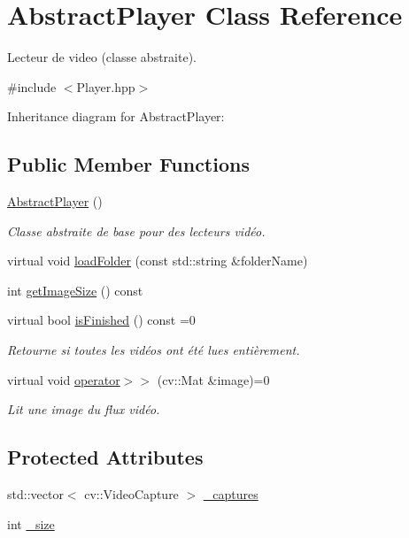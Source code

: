 \hypertarget{classAbstractPlayer}{}\section{Abstract\+Player Class Reference}
\label{classAbstractPlayer}


Lecteur de video (classe abstraite).  




{\ttfamily \#include $<$Player.\+hpp$>$}



Inheritance diagram for Abstract\+Player\+:
\subsection*{Public Member Functions}
\begin{DoxyCompactItemize}
\item 
\hyperlink{classAbstractPlayer_a4987602a4b3381a9c592585dde7cf33b}{Abstract\+Player} ()
\begin{DoxyCompactList}\small\item\em Classe abstraite de base pour des lecteurs vidéo. \end{DoxyCompactList}\item 
virtual void \hyperlink{classAbstractPlayer_a2091b1757bfd13116dfa4612af55473b}{load\+Folder} (const std\+::string \&folder\+Name)
\item 
int \hyperlink{classAbstractPlayer_a8bdc017fb32c90e6635ed6b7491fbe98}{get\+Image\+Size} () const 
\item 
virtual bool \hyperlink{classAbstractPlayer_a841896a599ebe6b8317905de78c44bcc}{is\+Finished} () const =0
\begin{DoxyCompactList}\small\item\em Retourne si toutes les vidéos ont été lues entièrement. \end{DoxyCompactList}\item 
virtual void \hyperlink{classAbstractPlayer_a5c9a863c96224dd297aa44c69010cd94}{operator$>$$>$} (cv\+::\+Mat \&image)=0
\begin{DoxyCompactList}\small\item\em Lit une image du flux vidéo. \end{DoxyCompactList}\end{DoxyCompactItemize}
\subsection*{Protected Attributes}
\begin{DoxyCompactItemize}
\item 
std\+::vector$<$ cv\+::\+Video\+Capture $>$ \hyperlink{classAbstractPlayer_a72dd2ef25310decd45671a7d51e1f319}{\+\_\+captures}
\item 
int \hyperlink{classAbstractPlayer_a9d8395a141cc985622d4910209bc7d53}{\+\_\+size}
\end{DoxyCompactItemize}



